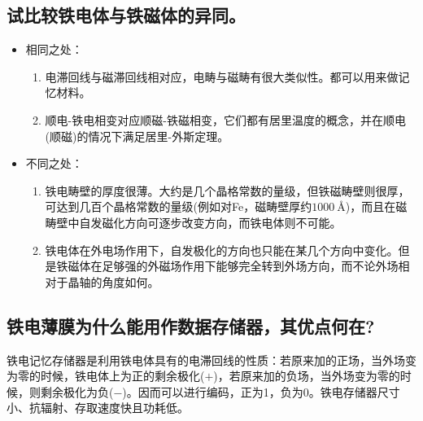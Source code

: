 \documentclass[a4paper]{article}
\begin{document}
\subsection{试比较铁电体与铁磁体的异同。}
\begin{itemize}
\item 相同之处：
\begin{enumerate}
    \item 电滞回线与磁滞回线相对应，电畴与磁畴有很大类似性。都可以用来做记忆材料。
    \item 顺电-铁电相变对应顺磁-铁磁相变，它们都有居里温度的概念，并在顺电(顺磁)的情况下满足居里-外斯定理。
\end{enumerate}
\item 不同之处：
\begin{enumerate}
    \item 铁电畴壁的厚度很薄。大约是几个晶格常数的量级，但铁磁畴壁则很厚，可达到几百个晶格常数的量级(例如对Fe，磁畴壁厚约$\SI{1000}{\angstrom}$)，而且在磁畴壁中自发磁化方向可逐步改变方向，而铁电体则不可能。
    \item 铁电体在外电场作用下，自发极化的方向也只能在某几个方向中变化。但是铁磁体在足够强的外磁场作用下能够完全转到外场方向，而不论外场相对于晶轴的角度如何。
\end{enumerate}
\end{itemize}

\subsection{铁电薄膜为什么能用作数据存储器，其优点何在?}
铁电记忆存储器是利用铁电体具有的电滞回线的性质：若原来加的正场，当外场变为零的时候，铁电体上为正的剩余极化($+$)，若原来加的负场，当外场变为零的时候，则剩余极化为负($-$)。因而可以进行编码，正为1，负为0。铁电存储器尺寸小、抗辐射、存取速度快且功耗低。
\fi

\nocite{jiaocai}

\end{document}
